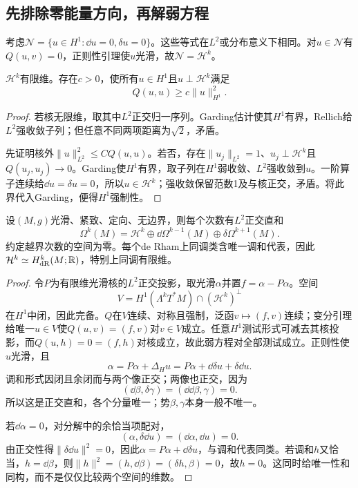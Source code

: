 \subsection*{先排除零能量方向，再解弱方程}
考虑$\mathcal N=\{u\in H^1:\dd u=0,\delta u=0\}$。这些等式在$L^2$或分布意义下相同。对$u\in\mathcal N$有$Q(u,v)=0$，正则性引理使$u$光滑，故$\mathcal N=\mathcal H^k$。

\begin{lemma}[有限维核与核外强制性]\label{lem:hodge-coercivity}
$\mathcal H^k$有限维。存在$c>0$，使所有$u\in H^1$且$u\perp\mathcal H^k$满足
\[
 Q(u,u)\geq c\|u\|_{H^1}^2.
\]
\end{lemma}
\begin{proof}
若核无限维，取其中$L^2$正交归一序列。Garding估计使其$H^1$有界，Rellich给$L^2$强收敛子列；但任意不同两项距离为$\sqrt2$，矛盾。

先证明核外$\|u\|_{L^2}^2\leq C Q(u,u)$。若否，存在$\|u_j\|_{L^2}=1$、$u_j\perp\mathcal H^k$且$Q(u_j,u_j)\to0$。Garding使$H^1$有界，取子列在$H^1$弱收敛、$L^2$强收敛到$u$。一阶算子连续给$\dd u=\delta u=0$，所以$u\in\mathcal H^k$；强收敛保留范数1及与核正交，矛盾。将此界代入Garding，便得$H^1$强制性。
\end{proof}

\begin{theorem}[Hodge分解与调和代表]\label{thm:hodge-decomposition}
设$(M,g)$光滑、紧致、定向、无边界，则每个次数有$L^2$正交直和
\[
 \Omega^k(M)=\mathcal H^k\oplus\dd\Omega^{k-1}(M)
                        \oplus\delta\Omega^{k+1}(M).
\]
约定越界次数的空间为零。每个de Rham上同调类含唯一调和代表，因此$\mathcal H^k\simeq H^k_{\mathrm{dR}}(M;\mathbb{R})$，特别上同调有限维。
\end{theorem}
\begin{proof}
令$P$为有限维光滑核的$L^2$正交投影，取光滑$\alpha$并置$f=\alpha-P\alpha$。空间
\[
 V=H^1(\Lambda^kT^*M)\cap(\mathcal H^k)^\perp
\]
在$H^1$中闭，因此完备。$Q$在$V$连续、对称且强制，泛函$v\mapsto(f,v)$连续；变分引理给唯一$u\in V$使$Q(u,v)=(f,v)$对$v\in V$成立。任意$H^1$测试形式可减去其核投影，而$Q(u,h)=0=(f,h)$对核成立，故此弱方程对全部测试成立。正则性使$u$光滑，且
\[
 \alpha=P\alpha+\Delta_Hu=P\alpha+\dd\delta u+\delta\dd u.
\]
调和形式因闭且余闭而与两个像正交；两像也正交，因为
\[
 (\dd\beta,\delta\gamma)=(\dd\dd\beta,\gamma)=0.
\]
所以这是正交直和，各个分量唯一；势$\beta,\gamma$本身一般不唯一。

若$\dd\alpha=0$，对分解中的余恰当项配对，
\[
 (\alpha,\delta\dd u)=(\dd\alpha,\dd u)=0.
\]
由正交性得$\|\delta\dd u\|^2=0$，因此$\alpha=P\alpha+\dd\delta u$，与调和代表同类。若调和$h$又恰当，$h=\dd\beta$，则$\|h\|^2=(h,\dd\beta)=(\delta h,\beta)=0$，故$h=0$。这同时给唯一性和同构，而不是仅仅比较两个空间的维数。
\end{proof}

